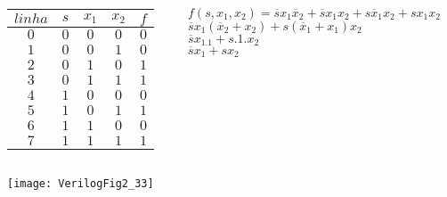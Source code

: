 \begin{frame}{\insertsection} %
    \begin{columns}
        \begin{column}{0.40\textwidth}
        \centering
            \begin{tabular}{c|ccc||c} %
            \hline
            \scriptsize $linha$ & $s$ & $x_1$ & $x_2$ & $f$ \\
            \hline
            \hline
            \scriptsize $0$ & $0$ & $0$ & $0$ & $0$ \\
            \scriptsize $1$ & $0$ & $0$ & $1$ & $0$ \\
            \scriptsize $2$ & $0$ & $1$ & $0$ & $1$ \\
            \scriptsize $3$ & $0$ & $1$ & $1$ & $1$ \\
            \scriptsize $4$ & $1$ & $0$ & $0$ & $0$ \\
            \scriptsize $5$ & $1$ & $0$ & $1$ & $1$ \\
            \scriptsize $6$ & $1$ & $1$ & $0$ & $0$ \\
            \scriptsize $7$ & $1$ & $1$ & $1$ & $1$ \\
            \hline
            \end{tabular}
        \end{column}        
        \begin{column}{0.60\textwidth}
            \pause
            $f(s, x_1, x_2)  = \overline{s}x_1\overline{x}_2 + \overline{s}x_1x_2 + s\overline{x}_1x_2 + sx_1x_2$ \\
            \vspace{0.5cm}
            \pause
            $\overline{s}x_1(\overline{x}_2+x_2) + s(\overline{x}_1+x_1)x_2$ \\
            \vspace{0.5cm}
            \pause
            $\overline{s}x_1.1 + s.1.x_2$ \\
            \vspace{0.5cm}
            \pause
            $\overline{s}x_1 + sx_2$ \\
        \end{column}
    \end{columns}
\end{frame}

\begin{frame}{\insertsection}   \centering
    \texttt{[image: VerilogFig2\_33]}
\end{frame}

